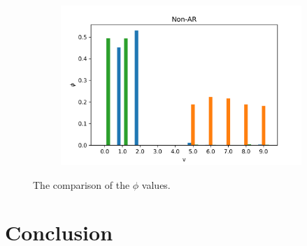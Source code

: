 \documentclass{mpaper}
\begin{document}
\begin{figure}
  \begin{subfigure}[b]{0.48\textwidth}
    \includegraphics[width=\linewidth]{phi-nonar.png}
  \end{subfigure}%
  \caption{The comparison of the $\phi$ values.}
  \label{fig:comp_phi}
\end{figure}
 
\par

\section{Conclusion}

\lipsum[1]



\end{document}
